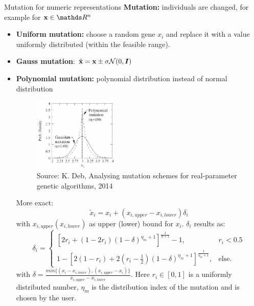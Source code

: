 \begin{frame}{Mutation for numeric representations}
  \textbf{Mutation:} individuals are changed, for example for $\x \in \R^n$
  \begin{itemize}
  \item \textbf{Uniform mutation:} choose a random gene $x_i$ and replace it with a value uniformly distributed (within the feasible range).
  \item \textbf{Gauss mutation}: $\tilde{\mathbf{x}} = \mathbf{x} \pm \sigma \mathcal{N}(0, \boldsymbol{I})$
  \item \textbf{Polynomial mutation:} polynomial distribution instead of normal distribution
  \begin{center}
  \begin{figure}
    \includegraphics[height = 3.5cm, width = 4cm]{images/polynomial_mutation.png}\\
    \scriptsize{Source: K. Deb, Analysing mutation schemes for real-parameter genetic algorithms, 2014}
  \end{figure}
   \end{center}
   \framebreak
  More exact:
  $$
  {\tilde x_{i}} = x_{i} + (x_{i,upper} - x_{i,lower}) \delta_{i}
  $$
  with $x_{i,upper} (x_{i,lower})$ as upper (lower) bound for $x_{i}$.
  $\delta_{i}$ results as:
  \footnotesize
  $$
  \delta_{i} =
  \begin{cases}
  [2r_{i}+(1-2r_{i})(1-\delta)^{\eta_{m}+1}]^{\frac{1}{\eta +1}} -1, & r_{i} < 0.5 \\
  1 - [2(1-r_{i})+2(r_{i}-\frac{1}{2})(1-\delta)^{\eta_{m}+1}]^{\frac{1}{\eta_{m} +1}}, &  \text{else.}
  \end{cases}
  $$
  with  $\delta = \frac{min\{(x_{i} - x_{i,lower}), (x_{i,upper}-x_{i})\}}{x_{i,upper} - x_{i,lower}}$.
  \normalsize
  \vspace{0.5cm}
  Here $r_{i} \in [0,1]$ is a uniformly distributed number, $\eta_{m}$ is the distribution index of the mutation and is chosen by the user.\\
  \normalsize
  \end{itemize}

\end{frame}

